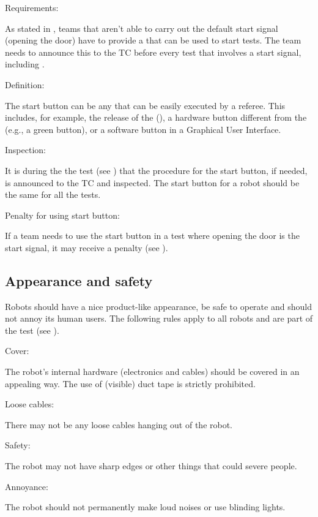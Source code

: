 \begin{enumerate}
	{\bf\item Requirements:} As stated in , teams that aren't able to carry out the default start signal (opening the door) have to provide a  that can be used to start tests. The team needs to announce this to the TC before every test that involves a start signal, including .
	{\bf\item Definition:} The start button can be any  that can be easily executed by a referee.  This includes, for example, the release of the  (), a hardware button different from the  (e.g., a green button), or a software button in a Graphical User Interface. 
	{\bf\item Inspection:} It is during the the  test (see ) that the procedure for the start button, if needed, is announced to the TC and inspected. The start button for a robot should be the same for all the tests.
	{\bf\item Penalty for using start button:} If a team needs to use the start button in a test where opening the door is the start signal, it may receive a penalty (see ).
\end{enumerate}



\subsection{Appearance and safety}
\label{rule:roobt_appearance}

Robots should have a nice product-like appearance, be safe to operate and should not annoy its human users. The following rules apply to all robots and are part of the  test (see ). 
\begin{enumerate}
	{\bf\item Cover:} The robot's internal hardware (electronics and cables) should be covered in an appealing way. The use of (visible) duct tape is strictly prohibited.
	{\bf\item Loose cables:} There may not be any loose cables hanging out of the robot. 
	{\bf\item Safety:} The robot may not have sharp edges or other things that could severe people.
	{\bf\item Annoyance:} The robot should not permanently make loud noises or use blinding lights.
\end{enumerate}




